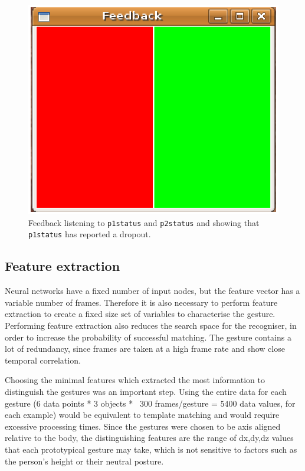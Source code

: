 \documentclass[12pt,a4,notitlepage]{report}
\renewcommand{\_}{\texttt{\symbol{95}}}
\newcommand{\<}{\texttt{\symbol{60}}}
\renewcommand{\>}{\texttt{\symbol{62}}}
\newcommand{\scopendpoint}[1]{\texttt{#1}}
\begin{document}
\begin{figure}
\centering
\includegraphics[scale=0.4,angle=0]{images/feedback.ps}
\caption{Feedback listening to \scopendpoint{p1status} and \scopendpoint{p2status} and showing that \scopendpoint{p1status} has reported a dropout.}
\label{feedback}
\end{figure}

\subsection{Feature extraction}

Neural networks have a fixed number of input nodes, but the feature vector has a variable number of frames. Therefore it is also necessary to perform feature extraction to create a fixed size set of variables to characterise the gesture. Performing feature extraction also reduces the search space for the recogniser, in order to increase the probability of successful matching. The gesture contains a lot of redundancy, since frames are taken at a high frame rate and show close temporal correlation.

Choosing the minimal features which extracted the most information to distinguish the gestures was an important step. Using the entire data for each gesture (6 data points * 3 objects * ~300 frames/gesture = 5400 data values, for each example) would be equivalent to template matching and would require excessive processing times. Since the gestures were chosen to be axis aligned relative to the body, the distinguishing features are the range of dx,dy,dz values that each prototypical gesture may take, which is not sensitive to factors such as the person's height or their neutral posture.
\end{document}
